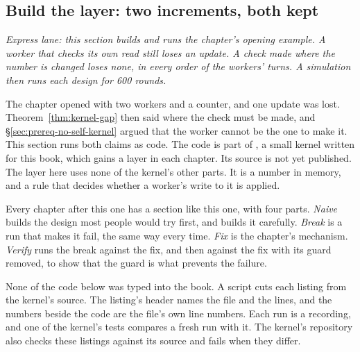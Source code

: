 %
\subsection{Build the layer: two increments, both kept}
\label{sec:prereq-build}

\noindent\emph{Express lane: this section builds and runs the chapter's
opening example. A worker that checks its own read still loses an update. A
check made where the number is changed loses none, in every order of the
workers' turns. A simulation then runs each design for 600 rounds.}

The chapter opened with two workers and a counter, and one update was lost.
Theorem~\ref{thm:kernel-gap} then said where the check must be made, and
\S\ref{sec:prereq-no-self-kernel} argued that the worker cannot be the one
to make it. This section runs both claims as code. The code is part of
\pdkernelname{}, a small kernel written for this book, which gains a layer
in each chapter. Its source is not yet published. The layer here uses none
of the kernel's other parts. It is a number in memory, and a rule that
decides whether a worker's write to it is applied.

Every chapter after this one has a section like this one, with four parts.
\emph{Naive} builds the design most people would try first, and builds it
carefully. \emph{Break} is a run that makes it fail, the same way every
time. \emph{Fix} is the chapter's mechanism. \emph{Verify} runs the break
against the fix, and then against the fix with its guard removed, to show
that the guard is what prevents the failure.

None of the code below was typed into the book. A script cuts each listing
from the kernel's source. The listing's header names the file and the
lines, and the numbers beside the code are the file's own line numbers.
Each run is a recording, and one of the kernel's tests compares a fresh run
with it. The kernel's repository also checks these listings against its
source and fails when they differ.

